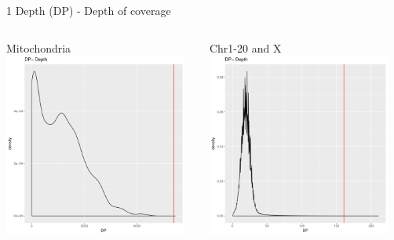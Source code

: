 \documentclass[t,10pt]{beamer}
\begin{document}
\begin{frame}[label={sec:orgheadline8}]{1 Depth (DP) - Depth of coverage}
\vspace{-15.5pt}
\begin{columns}
\begin{column}{0.5\columnwidth}
\begin{block}{Mitochondria}
\includegraphics[width=6cm,height=6cm]{figures/chrM/document-page7.png}
\end{block}
\end{column}
\begin{column}{0.5\columnwidth}
\begin{block}{Chr1-20 and X}
\includegraphics[width=6cm,height=6cm]{figures/NO_chrM/document-page7.png}
\end{block}
\end{column}
\end{columns}
\end{frame}
\end{document}
